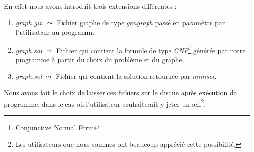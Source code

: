   En effet nous avons introduit trois extensions différentes :
  \begin{enumerate}
   \item \emph{graph.gin} $\leadsto$ Fichier graphe de type
	 \emph{gengraph} passé en paramètre par l'utilisateur au
	 programme
   \item \emph{graph.sat} $\leadsto$ Fichier qui contient la formule de
	 type \emph{CNF\footnote{Conjunctive Normal Form}} générée par
	 notre programme à partir du choix du problème et du graphe.
   \item \emph{graph.sol} $\leadsto$ Fichier qui contient la solution
	 retournée par \emph{minisat}.
  \end{enumerate}

  Nous avons fait le choix de laisser ces fichiers sur le disque après
  exécution du programme, dans le cas où l'utilisateur souhaiterait y
  jeter un \oe{}il\footnote{Les utilisateurs que nous sommes ont
  beaucoup apprécié cette possibilité.}.
